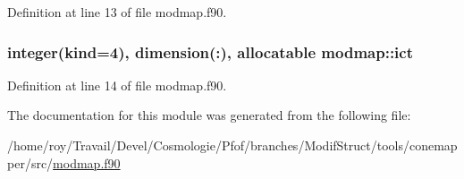 Definition at line 13 of file modmap.\-f90.

\hypertarget{classmodmap_af68652ecce879493f3a84180017cccbd}{
\subsubsection[{ict}]{\setlength{\rightskip}{0pt plus 5cm}integer(kind=4), dimension(\-:), allocatable modmap\-::ict}}\label{classmodmap_af68652ecce879493f3a84180017cccbd}


Definition at line 14 of file modmap.\-f90.



The documentation for this module was generated from the following file\-:\begin{DoxyCompactItemize}
\item 
/home/roy/\-Travail/\-Devel/\-Cosmologie/\-Pfof/branches/\-Modif\-Struct/tools/conemapper/src/\hyperlink{modmap_8f90}{modmap.\-f90}\end{DoxyCompactItemize}
